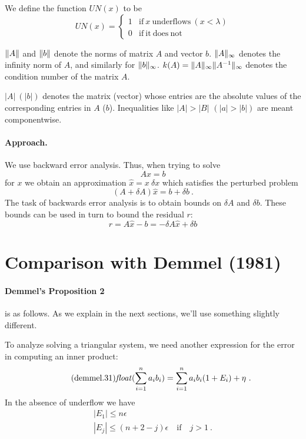 \documentclass[a4paper]{article}
\begin{document}
We define the function $\mathit{UN}(x)$ to be
\[
UN(x)=\left\lbrace\begin{array}{ll}1 & \mathrm{if}~x~\mathrm{underflows}~(x<\lambda)\\
    0 & \mathrm{if~it~does~not}\end{array}\right.
  \]

\newcommand{\norm}[1]{\ensuremath \lVert #1 \rVert}
$\norm{A}$ and $\norm{b}$ denote the norms of matrix $A$ and vector $b$.
$\norm{A}_\infty$ denotes the infinity norm of $A$, and similarly for
$\norm{b}_\infty$.  $k(A)=\norm{A}_\infty\norm{A^{-1}}_\infty$ denotes the condition number
of the matrix $A$.

$|A|~(|b|)$ denotes the matrix (vector) whose entries are the absolute values
  of the corresponding entries in $A$ ($b$).  Inequalities like $|A|>|B|$
  $(|a|>|b|)$ are meant componentwise.

\paragraph{Approach.}
We use backward error analysis.  Thus, when trying
to solve
\begin{equation}\tag{12}
  Ax = b
\end{equation}
for $x$ we obtain an approximation $\hat{x}=x~\delta x$ which satisfies the
perturbed problem
\begin{equation}\tag{13}
  (A+\delta A)\hat{x}=b+\delta b~.
\end{equation}
The task of backwards error analysis is to obtain bounds on $\delta A$ and $\delta b$.
These bounds can be used in turn to bound the residual $r$:
\begin{equation}\tag{14}
  r = A \hat{x}-b = -\delta A \hat{x} + \delta b
\end{equation}

\section{Comparison with Demmel (1981)}

  \paragraph*{Demmel's Proposition 2} is as follows.  As we explain in the
  next sections, we'll use something slightly different.

\newcommand\float[1]{\ensuremath \mathit{float}(#1)}
To analyze solving a triangular system, we need another expression for the error in
computing an inner product:
\begin{equation}\tag{demmel.31}
  \float{\sum_{i=1}^n a_i b_i} = \sum_{i=1}^n a_i b_i (1 + E_i) + \eta ~.
\end{equation}
In the absence of underflow we have
\begin{equation}\tag{demmel.32}
\begin{array}{l}
  |E_1| \le n \epsilon \\
  |E_j| \le (n+2-j)\epsilon \quad \mathrm{if}\quad j>1~.
\end{array}
\end{equation}
\end{document}
